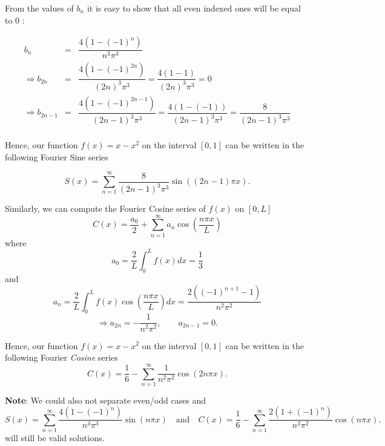 \documentclass[11pt]{article}
\begin{document}
\begin{solution}
From the values of $b_{n}$ it is easy to show that all even indexed ones will be equal to 0 :

\begin{eqnarray*}
b_{n} & = & \dfrac{4(1-(-1)^n)}{n^3 \pi^3} \\
\Rightarrow b_{2n}& = & \dfrac{4(1-(-1)^{2n})}{(2n)^3 \pi^3} = \dfrac{4(1-1)}{(2n)^3 \pi^3} =0 \\
\Rightarrow b_{2n-1}& = & \dfrac{4(1-(-1)^{2n-1})}{(2n-1)^3 \pi^3} = \dfrac{4(1-(-1))}{(2n-1)^3 \pi^3} = \dfrac{8}{(2n-1)^3 \pi^3} \\
\end{eqnarray*}

Hence, our function $f(x) = x - x^2$  on the interval $ [0,1]$ can be written in the following Fourier Sine series

\begin{equation*}
\boxed{S(x) = \sum_{n=1}^{\infty} \dfrac{8}{(2n-1)^3 \pi^3}\sin( (2n-1)\pi x)}. 
\end{equation*}

Similarly, we can compute the Fourier Cosine series of $f(x)$ on $[0, L]$
\begin{equation*}
C(x) = \frac{a_{0}}{2}+\sum_{n=1}^{\infty} a_{n} \cos \left(\dfrac{n\pi x}{L}\right)
\end{equation*}
where
\[a_{0}=\frac{2}{L}\int_{0}^{L}f(x)dx = \frac{1}{3}\]
and
\begin{equation*}
a_{n}=\frac{2}{L}\int_{0}^{L}f(x)\cos \left(\dfrac{n\pi x}{L}\right) dx = \frac{2((-1)^{n+1}-1)}{n^{2}\pi^{2}} 
\end{equation*}
\[\Rightarrow a_{2n}=-\frac{1}{n^{2}\pi^{2}}, \qquad a_{2n-1}=0.\]

Hence, our function $f(x) = x - x^2$  on the interval $[0,1]$ can be written in the following Fourier \textsl{Cosine} series
\begin{equation*}
\boxed{C(x) = \frac{1}{6}-\sum_{n=1}^{\infty} \frac{1}{n^{2}\pi^{2}} \cos \left({2n\pi x}\right)}.
\end{equation*}

\textbf{Note}: We could also not separate even/odd cases and
\begin{equation*}
\boxed{S(x) = \sum_{n=1}^{\infty} \dfrac{4(1-(-1)^n)}{n^3 \pi^3} \sin(n\pi x)}
\quad \text{and} \quad \boxed{C(x) = \frac{1}{6}-\sum_{n=1}^{\infty}  \frac{2(1+(-1)^{n})}{n^{2}\pi^{2}}  \cos \left({n\pi x}\right)}.
\end{equation*}
will still be valid solutions.
\end{solution}
\end{document}
